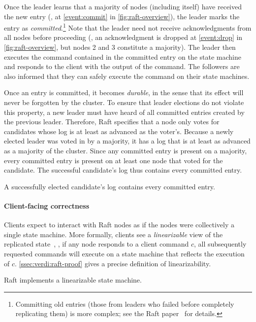 Once the leader learns that a majority of nodes (including itself)
have received the new entry
(\eg, at \cref{event:commit} in \cref{fig:raft-overview}),
the leader marks the entry as \emph{committed}.\footnote{Committing
  old entries (those from leaders who failed before completely
  replicating them) is more complex; see the Raft
  paper~\cite{ongaro:raft} for details.}
Note that the leader need not receive acknowledgments
from all nodes before proceeding
(\eg, an acknowledgment is dropped at \cref{event:drop} in \cref{fig:raft-overview},
but nodes 2 and 3 constitute a majority).
The leader then executes the command contained in the committed entry on the state machine and
responds to the client with the output of the command.
The followers are also informed that they can safely execute
the command on their state machines.

Once an entry is committed, it becomes \emph{durable},
in the sense that its effect will never be forgotten by the cluster.
To ensure that leader elections do not violate this property,
a new leader must have heard of
all committed entries created by the previous leader.
Therefore, Raft specifies that a node only votes for candidates whose
log is at least as advanced as the voter's.
Because a newly elected leader was voted in by a majority,
it has a log that is at least as advanced
as a majority of the cluster.
Since any committed entry is present on a majority,
every committed entry is present on at least one node that voted for the candidate.
The successful candidate's log thus contains every committed entry.
\begin{proposition}\label{prop:leader-completeness}
  A successfully elected candidate's log contains every committed entry.
\end{proposition}

\paragraph*{Client-facing correctness}
Clients expect to interact with Raft nodes
as if the nodes were collectively a single state machine.
More formally, clients see a
\textit{linearizable} view of the replicated state~\cite{herlihy:linearizability},
\ie, if any node responds to a client command $c$,
all subsequently requested commands will execute on a state machine
that reflects the execution of $c$.
\cref{ssec:verdi:raft-proof} gives a precise definition of linearizability.
\begin{proposition}
  Raft implements a linearizable state machine.
\end{proposition}

